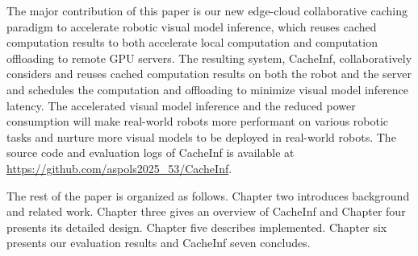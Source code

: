 The major contribution of this paper is our new edge-cloud collaborative caching paradigm to accelerate robotic visual model inference, which reuses cached computation results to both accelerate local computation and computation offloading to remote GPU servers.
The resulting system, CacheInf, collaboratively considers and reuses cached computation results on both the robot and the server and schedules the computation and offloading to minimize visual model inference latency.
The accelerated visual model inference and the reduced power consumption will make real-world robots more performant on various robotic tasks and nurture more visual models to be deployed in real-world robots.
The source code and evaluation logs of CacheInf is available at \url{https://github.com/aspols2025_53/CacheInf}.

The rest of the paper is organized as follows.
Chapter two introduces background and related work.
Chapter three gives an overview of CacheInf and Chapter four presents its detailed design.
Chapter five describes implemented.
Chapter six presents our evaluation results and CacheInf seven concludes.

